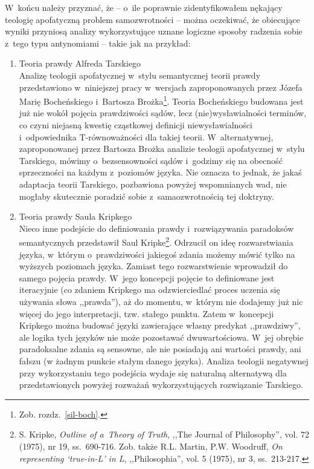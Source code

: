 W~końcu należy przyznać, że -- o~ile poprawnie zidentyfikowałem nękający teologię apofatyczną problem samozwrotności -- można oczekiwać, że obiecujące wyniki przyniosą analizy wykorzystujące uznane logiczne sposoby radzenia sobie z~tego typu antynomiami -- takie jak na przykład:
\begin{enumerate}[label = \arabic*), itemindent=6mm, labelwidth=4mm, labelsep=2mm, itemsep=1em, leftmargin=0mm]
\item Teoria prawdy Alfreda Tarskiego\\
Analizę teologii apofatycznej w~stylu semantycznej teorii prawdy przedstawiono w~niniejszej pracy w~wersjach zaproponowanych przez Józefa Marię Bocheńskiego i~Bartosza Brożka\footnote{Zob. rozdz.~\ref{sil-boch}.}. Teoria Bocheńskiego budowana jest już nie wokół pojęcia prawdziwości sądów, lecz (nie)wysławialności terminów, co czyni niejasną kwestię cząstkowej definicji niewysławialności i~odpowiednika T-równoważności dla takiej teorii. W~alternatywnej, zaproponowanej przez Bartosza Brożka analizie teologii apofatycznej w~stylu Tarskiego, mówimy o~bezsensowności sądów i~godzimy się na obecność sprzeczności na każdym z~poziomów języka. Nie oznacza to jednak, że jakaś adaptacja teorii Tarskiego, pozbawiona powyżej wspomnianych wad, nie mogłaby skutecznie poradzić sobie z~samaozwrotnością tej doktryny.

\item Teoria prawdy Saula Kripkego\\
Nieco inne podejście do definiowania prawdy i~rozwiązywania paradoksów semantycznych przedstawił Saul Kripke\footnote{S. Kripke, \textit{Outline of a~Theory of Truth}, ,,The Journal of Philosophy'', vol. 72 (1975), nr 19, ss.~690-716. Zob. także R.L. Martin, P.W. Woodruff, \textit{On representing ‘true-in-L' in L}, ,,Philosophia'', vol. 5 (1975), nr 3, ss.~213-217.}. Odrzucił on ideę rozwarstwiania języka, w~którym o~prawdziwości jakiegoś zdania możemy mówić tylko na wyższych poziomach języka. Zamiast tego rozwarstwienie wprowadził do samego pojęcia prawdy. W~jego koncepcji pojęcie to definiowane jest iteracyjnie (co zdaniem Kripkego ma odzwierciedlać proces uczenia się używania słowa ,,prawda''), aż do momentu, w~którym nie dodajemy już nic więcej do jego interpretacji, tzw. stałego punktu. Zatem w~koncepcji Kripkego można budować języki zawierające własny predykat ,,prawdziwy'', ale logika tych języków nie może pozostawać dwuwartościowa. W~jej obrębie paradoksalne zdania są sensowne, ale nie posiadają ani wartości prawdy, ani fałszu (w żadnym punkcie stałym danego języka). Analiza teologii negatywnej przy wykorzystaniu tego podejścia wydaje się naturalną alternatywą dla przedstawionych powyżej rozważań wykorzystujących rozwiązanie Tarskiego.


\end{enumerate}
